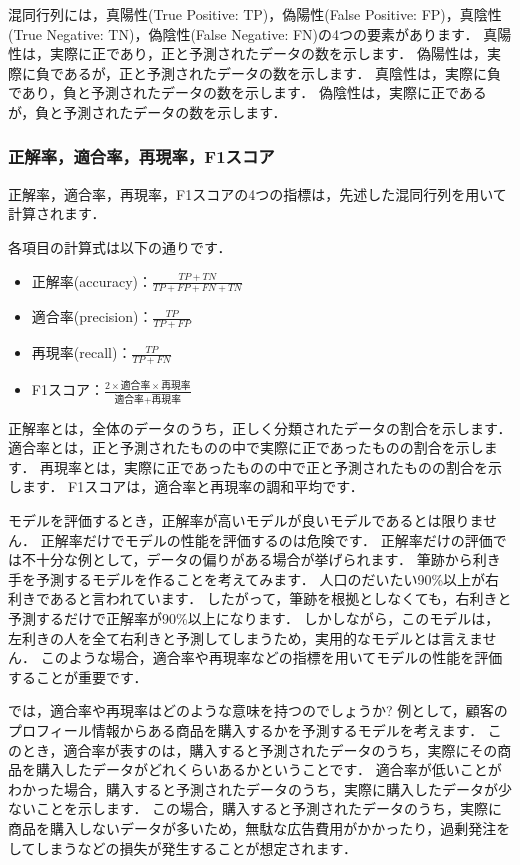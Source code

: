 \documentclass{jarticle}
\begin{document}
混同行列には，真陽性(True Positive: TP)，偽陽性(False Positive: FP)，真陰性(True Negative: TN)，偽陰性(False Negative: FN)の4つの要素があります．
真陽性は，実際に正であり，正と予測されたデータの数を示します．
偽陽性は，実際に負であるが，正と予測されたデータの数を示します．
真陰性は，実際に負であり，負と予測されたデータの数を示します．
偽陰性は，実際に正であるが，負と予測されたデータの数を示します．

\subsubsection{正解率，適合率，再現率，F1スコア}
正解率，適合率，再現率，F1スコアの4つの指標は，先述した混同行列を用いて計算されます．

各項目の計算式は以下の通りです．

\begin{itemize}
  \item 正解率(accuracy)：$\frac{TP + TN}{TP + FP + FN + TN}$
  \item 適合率(precision)：$\frac{TP}{TP + FP}$
  \item 再現率(recall)：$\frac{TP}{TP + FN}$
  \item F1スコア：$\frac{2 \times \text{適合率} \times \text{再現率}}{\text{適合率} + \text{再現率}}$
\end{itemize}

正解率とは，全体のデータのうち，正しく分類されたデータの割合を示します．
適合率とは，正と予測されたものの中で実際に正であったものの割合を示します．
再現率とは，実際に正であったものの中で正と予測されたものの割合を示します．
F1スコアは，適合率と再現率の調和平均です．

モデルを評価するとき，正解率が高いモデルが良いモデルであるとは限りません．
正解率だけでモデルの性能を評価するのは危険です．
正解率だけの評価では不十分な例として，データの偏りがある場合が挙げられます．
筆跡から利き手を予測するモデルを作ることを考えてみます．
人口のだいたい90\%以上が右利きであると言われています．
したがって，筆跡を根拠としなくても，右利きと予測するだけで正解率が90\%以上になります．
しかしながら，このモデルは，左利きの人を全て右利きと予測してしまうため，実用的なモデルとは言えません．
このような場合，適合率や再現率などの指標を用いてモデルの性能を評価することが重要です．

では，適合率や再現率はどのような意味を持つのでしょうか?
例として，顧客のプロフィール情報からある商品を購入するかを予測するモデルを考えます．
このとき，適合率が表すのは，購入すると予測されたデータのうち，実際にその商品を購入したデータがどれくらいあるかということです．
適合率が低いことがわかった場合，購入すると予測されたデータのうち，実際に購入したデータが少ないことを示します．
この場合，購入すると予測されたデータのうち，実際に商品を購入しないデータが多いため，無駄な広告費用がかかったり，過剰発注をしてしまうなどの損失が発生することが想定されます．
\end{document}
